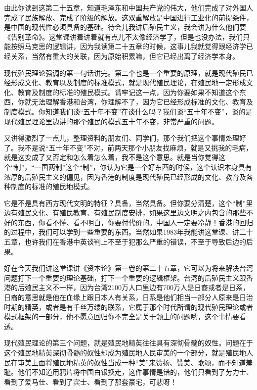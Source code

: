 \documentclass[UTF8, 12pt, a4paper]{ctexrep}
\begin{document}
由此你读到这第二十五章，知道毛泽东和中国共产党的伟大，他们完成了对外国人完成了民族解放、完成了阶级的解放。这双重解放是中国进行工业化的前提条件，是中国的现代性必须具备的基础。待会儿我讲后殖民主义，我会讲为什么他们要《告别革命》。这堂课讲着讲着就有点儿不太像经济学了，但是也没办法，我们只能按照马克思的逻辑讲，因为我读第二十五章的时候，这事儿我就觉得跟经济学已经关系，当然有重大的关联，因为原始积累嘛，但它已经出离了经济学本身。

现代殖民理论强调的第一句话讲完。第二个也是一个重要的原理，就是现代殖民已经形成文化、教育以及制度的标准模式，就是现代殖民理论，在殖民地一定形成文化、教育及制度的标准的殖民模式。请牢记这一点，因为你要如果不知道这个东西，你就无法理解香港和台湾，你理解不了，因为它已经形成标准的文化、教育及制度模式。你知道我们谈“五十年不变”在谈什么吗？我们谈“五十年不变”，谈的是现代殖民理论里边讲的那个殖民的模式五十年不变，非常严重的问题。

又讲得激烈了一点儿，整理资料的朋友们、同学们，那个我们把这个事情处理好了。我不是说“五十年不变”不对，前两天那个小朋友找麻烦，就是又挑我的毛病，就是这变成了又否定和怎么着怎么着，我不是这个意思。就是当你觉得这个“制”，“一国两制”这个“制”，你认为它是一个好东西的时候，这个认识本身具有浓厚的后殖民主义的偏见，因为香港的制度是现代殖民已经形成的文化、教育及各种制度的标准的殖民地模式。

它是不是具有西方现代文明的特征？具备，当然具备。但你要分清楚，这个“制”里边有殖民文化、有殖民教育、有殖民制度安排，如果这里边文明之内包含的那些不好的东西，你看不懂、看不明白，你要付代价的。中国人一定要冷静！香港的回归的过程中，我们可以学到一些重要的东西。当然如果1983年我能讲这堂课、讲二十五章，也许我们在香港中英谈判上不至于犯那么严重的错误，不至于导致后边的后果。

好在今天我们讲这堂课讲《资本论》第一卷的第二十五章，它可以为将来解决台湾问题打下一个重要的理论基础，打下一个重要的逻辑框架。台湾的后殖民主义跟香港的后殖民主义不一样，因为台湾2100万人口里边有700万人是日裔或者是日系，日裔的意思就是他在血缘上跟日本人有关系，日系是他们相当一部分人原来是日治时期的精英，或者是有千丝万缕的联系，它属于那个时代所谓的现代殖民理论或者模式框架的一部分，他不愿意回归你不完全是关于领土的问题哟，这个事情要看透。

现代殖民理论的第三个问题，就是殖民地精英往往具有深彻骨髓的奴性。问题在于这个殖民地精英深彻骨髓的奴性却成为殖民地人民审美的一个部分，就是殖民地人民在审美上面将殖民地精英的奴性当成一种“美”来赞扬、赞美、歌颂，而不知道羞耻。他们不知道用鸦片将中国白银换走，这件事情是错的，他们只看到了劳力士、看到了爱马仕、看到了宾士、看到了那套豪宅，可悲呀！
\end{document}
